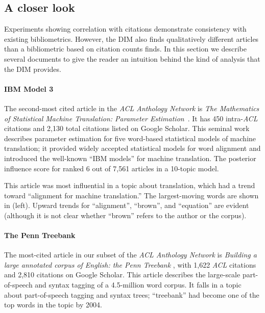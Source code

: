 \subsection*{A closer look}
Experiments showing correlation with citations demonstrate consistency
with existing bibliometrics. However, the DIM also finds qualitatively
different articles than a bibliometric based on citation counts
finds. In this section we describe several documents to give the
reader an intuition behind the kind of analysis that the DIM provides.

\paragraph{IBM Model 3} The second-most cited article in the \emph{ACL
  Anthology Network} is \emph{The Mathematics of Statistical Machine
  Translation: Parameter Estimation}~\citep{brown:1993}. It has 450
intra-\emph{ACL} citations and 2,130 total citations listed on Google
Scholar.  This seminal work describes parameter estimation for five
word-based statistical models of machine translation; it provided
widely accepted statistical models for word alignment and introduced
the well-known ``IBM models'' for machine translation. The posterior
influence score for \cite{brown:1993} ranked $6$ out of 7,561   %
articles in a 10-topic model.

This article was most influential in a topic about translation, which
had a trend toward ``alignment for machine translation.''  The
largest-moving words are shown in  (left).
Upward trends for ``alignment'', ``brown'', and ``equation'' are
evident (although it is not clear whether ``brown'' refers to the
author or the corpus).

\paragraph{The Penn Treebank}
The most-cited article in our subset of the \emph{ACL Anthology
  Network} is \emph{Building a large annotated corpus of English: the
  Penn Treebank} \citep{marcus:1993}, with 1,622 \emph{ACL} citations
and 2,810 citations on Google Scholar.  This article describes the
large-scale part-of-speech and syntax tagging of a 4.5-million word
corpus.  It falls in a topic about part-of-speech tagging and syntax
trees; ``treebank'' had become one of the top words in the topic by
2004.

